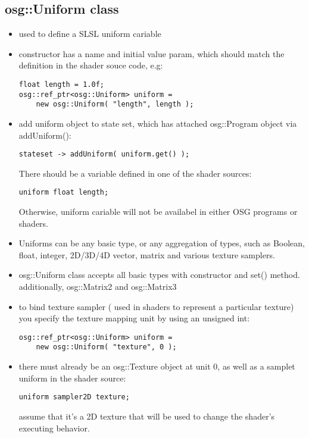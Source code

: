 \documentclass[a4paper,12pt]{book}
\begin{document}
\subsection{osg::Uniform class}
\begin{itemize}
\item used to define a SLSL uniform cariable
\item constructor has a name and initial value param, which should match the definition in the shader souce code, e.g:

\begin{lstlisting}
float length = 1.0f;
osg::ref_ptr<osg::Uniform> uniform = 
	new osg::Uniform( "length", length );
\end{lstlisting}

\item add uniform object to state set, which has attached osg::Program object via addUniform():\\

\begin{lstlisting}
stateset -> addUniform( uniform.get() );
\end{lstlisting}
There should be a variable defined in one of the shader sources:\\
\begin{lstlisting}
uniform float length;
\end{lstlisting}

Otherwise, uniform cariable will not be availabel in either OSG programs or shaders.\\

\item Uniforms can be any basic type, or any aggregation of types, such as Boolean, float, integer, 2D/3D/4D vector, matrix and various texture samplers.\\
\item osg::Uniform class accepts all basic types with constructor and set() method.\\
\textrightarrow additionally, osg::Matrix2 and osg::Matrix3\\

\item to bind texture sampler ( used in shaders to represent a particular texture) you specify the texture mapping unit by using an unsigned int:\\
\begin{lstlisting}
osg::ref_ptr<osg::Uniform> uniform = 
	new osg::Uniform( "texture", 0 );
\end{lstlisting}

\item there must already be an osg::Texture object at unit 0, as well as a samplet uniform in the shader source:\\
\begin{lstlisting}
uniform sampler2D texture;
\end{lstlisting}
\textrightarrow assume that it's a 2D texture that will be used to change the shader's executing behavior.

\end{itemize}
\end{document}
